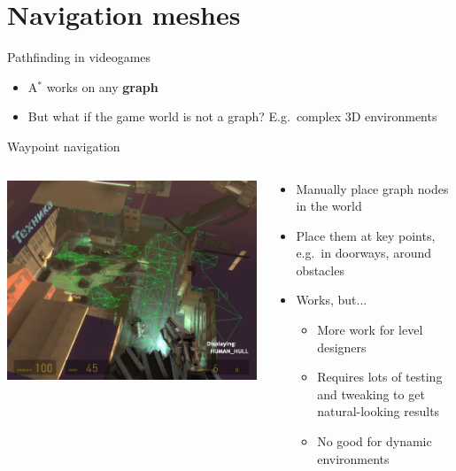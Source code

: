 \part{Navigation meshes}
\frame{\partpage}

\begin{frame}{Pathfinding in videogames}
	\begin{itemize}
		\pause\item A$^*$ works on any \textbf{graph}
		\pause\item But what if the game world is not a graph? E.g.\ complex 3D environments
	\end{itemize}
\end{frame}

\begin{frame}{Waypoint navigation}
	\begin{columns}
		\begin{column}{0.4\textwidth}
			\includegraphics[width=\textwidth]{nodegraph} %
		\end{column}
		\begin{column}{0.58\textwidth}
			\begin{itemize}
				\pause\item Manually place graph nodes in the world
				\pause\item Place them at key points, e.g.\ in doorways, around obstacles
				\pause\item Works, but...
					\begin{itemize}
						\pause\item More work for level designers
						\pause\item Requires lots of testing and tweaking to get natural-looking results
						\pause\item No good for dynamic environments
					\end{itemize}
			\end{itemize}
		\end{column}
	\end{columns}
\end{frame}

